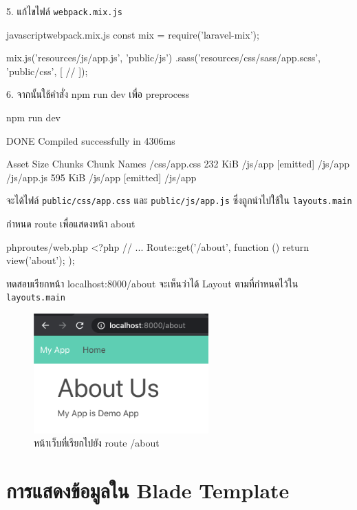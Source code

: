 5. แก้ไขไฟล์ \texttt{webpack.mix.js}

\begin{code}{javascript}{webpack.mix.js}{}
const mix = require('laravel-mix');

mix.js('resources/js/app.js', 'public/js')
    .sass('resources/css/sass/app.scss', 'public/css', [
        //
    ]);
\end{code}

6. จากนั้นใช้คำสั่ง npm run dev เพื่อ preprocess 
\begin{cli}{}
    npm run dev
\end{cli}

\begin{out}{}
DONE  Compiled successfully in 4306ms

       Asset     Size   Chunks             Chunk Names
/css/app.css  232 KiB  /js/app  [emitted]  /js/app
  /js/app.js  595 KiB  /js/app  [emitted]  /js/app
\end{out}

จะได้ไฟล์ \texttt{public/css/app.css} และ \texttt{public/js/app.js}
ซึ่งถูกนำไปใช้ใน \texttt{layouts.main}

\newpage

กำหนด route เพื่อแสดงหน้า about
\begin{code}{php}{routes/web.php}{}
    <?php
    // ...
    Route::get('/about', function () {
        return view('about');
    });
\end{code}


ทดสอบเรียกหน้า localhost:8000/about จะเห็นว่าได้ Layout ตามที่กำหนดไว้ใน \texttt{layouts.main}

\begin{figure}[h!]
    \centering
    \includegraphics[width=0.6\textwidth]{images/ch4/01.png}
    \caption{หน้าเว็บที่เรียกไปยัง route /about}
\end{figure}

\newpage

\section{การแสดงข้อมูลใน Blade Template}

